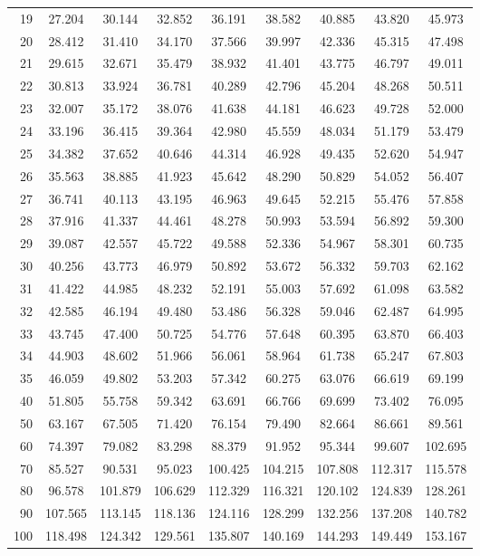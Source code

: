 \documentclass[
]{book}
\theoremstyle{definition}
\theoremstyle{definition}
\theoremstyle{definition}
\theoremstyle{definition}
\theoremstyle{remark}
\begin{document}
\begin{longtable}[]{@{}rcccccccc@{}}
19 & 27.204 & 30.144 & 32.852 & 36.191 & 38.582 & 40.885 & 43.820 & 45.973 \\
20 & 28.412 & 31.410 & 34.170 & 37.566 & 39.997 & 42.336 & 45.315 & 47.498 \\
21 & 29.615 & 32.671 & 35.479 & 38.932 & 41.401 & 43.775 & 46.797 & 49.011 \\
22 & 30.813 & 33.924 & 36.781 & 40.289 & 42.796 & 45.204 & 48.268 & 50.511 \\
23 & 32.007 & 35.172 & 38.076 & 41.638 & 44.181 & 46.623 & 49.728 & 52.000 \\
24 & 33.196 & 36.415 & 39.364 & 42.980 & 45.559 & 48.034 & 51.179 & 53.479 \\
25 & 34.382 & 37.652 & 40.646 & 44.314 & 46.928 & 49.435 & 52.620 & 54.947 \\
26 & 35.563 & 38.885 & 41.923 & 45.642 & 48.290 & 50.829 & 54.052 & 56.407 \\
27 & 36.741 & 40.113 & 43.195 & 46.963 & 49.645 & 52.215 & 55.476 & 57.858 \\
28 & 37.916 & 41.337 & 44.461 & 48.278 & 50.993 & 53.594 & 56.892 & 59.300 \\
29 & 39.087 & 42.557 & 45.722 & 49.588 & 52.336 & 54.967 & 58.301 & 60.735 \\
30 & 40.256 & 43.773 & 46.979 & 50.892 & 53.672 & 56.332 & 59.703 & 62.162 \\
31 & 41.422 & 44.985 & 48.232 & 52.191 & 55.003 & 57.692 & 61.098 & 63.582 \\
32 & 42.585 & 46.194 & 49.480 & 53.486 & 56.328 & 59.046 & 62.487 & 64.995 \\
33 & 43.745 & 47.400 & 50.725 & 54.776 & 57.648 & 60.395 & 63.870 & 66.403 \\
34 & 44.903 & 48.602 & 51.966 & 56.061 & 58.964 & 61.738 & 65.247 & 67.803 \\
35 & 46.059 & 49.802 & 53.203 & 57.342 & 60.275 & 63.076 & 66.619 & 69.199 \\
40 & 51.805 & 55.758 & 59.342 & 63.691 & 66.766 & 69.699 & 73.402 & 76.095 \\
50 & 63.167 & 67.505 & 71.420 & 76.154 & 79.490 & 82.664 & 86.661 & 89.561 \\
60 & 74.397 & 79.082 & 83.298 & 88.379 & 91.952 & 95.344 & 99.607 & 102.695 \\
70 & 85.527 & 90.531 & 95.023 & 100.425 & 104.215 & 107.808 & 112.317 & 115.578 \\
80 & 96.578 & 101.879 & 106.629 & 112.329 & 116.321 & 120.102 & 124.839 & 128.261 \\
90 & 107.565 & 113.145 & 118.136 & 124.116 & 128.299 & 132.256 & 137.208 & 140.782 \\
100 & 118.498 & 124.342 & 129.561 & 135.807 & 140.169 & 144.293 & 149.449 & 153.167 \\
\bottomrule
\end{longtable}
\end{document}
